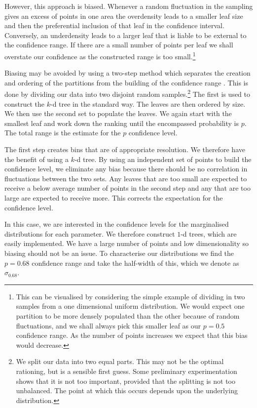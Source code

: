However, this approach is biased. Whenever a random fluctuation in the sampling gives an excess of points in one area the overdensity leads to a smaller leaf size and then the preferential inclusion of that leaf in the confidence interval. Conversely, an underdensity leads to a larger leaf that is liable to be external to the confidence range. If there are a small number of points per leaf we shall overstate our confidence as the constructed range is too small.\footnote{This can be visualised by considering the simple example of dividing in two samples from a one dimensional uniform distribution. We would expect one partition to be more densely populated than the other because of random fluctuations, and we shall always pick this smaller leaf as our $p = 0.5$ confidence range. As the number of points increases we expect that this bias would decrease.}

Biasing may be avoided by using a two-step method which separates the creation and ordering of the partitions from the building of the confidence range \citep{Sidery2013}. This is done by dividing our data into two disjoint random samples.\footnote{We split our data into two equal parts. This may not be the optimal rationing, but is a sensible first guess. Some preliminary experimentation shows that it is not too important, provided that the splitting is not too unbalanced. The point at which this occurs depends upon the underlying distribution.} The first is used to construct the $k$-d tree in the standard way. The leaves are then ordered by size. We then use the second set to populate the leaves. We again start with the smallest leaf and work down the ranking until the encompassed probability is $p$. The total range is the estimate for the $p$ confidence level.

The first step creates bins that are of appropriate resolution. We therefore have the benefit of using a $k$-d tree. By using an independent set of points to build the confidence level, we eliminate any bias because there should be no correlation in fluctuations between the two sets. Any leaves that are too small are expected to receive a below average number of points in the second step and any that are too large are expected to receive more. This corrects the expectation for the confidence level.

In this case, we are interested in the confidence levels for the marginalised distributions for each parameter. We therefore construct $1$-d trees, which are easily implemented. We have a large number of points and low dimensionality so biasing should not be an issue. To characterise our distributions we find the $p = 0.68$ confidence range and take the half-width of this, which we denote as $\sigma_{0.68}$.

